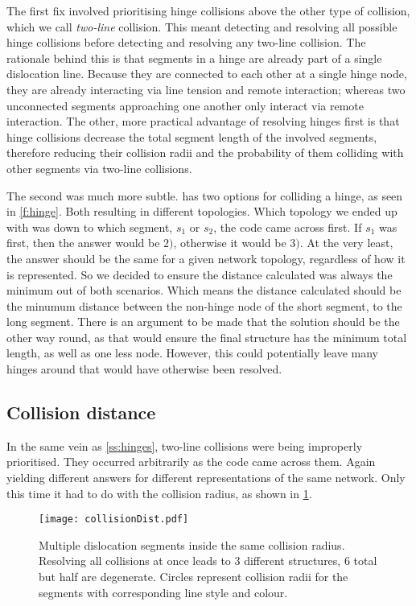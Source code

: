 The first fix involved prioritising hinge collisions above the other type of collision, which we call \emph{two-line} collision. This meant detecting and resolving all possible hinge collisions before detecting and resolving any two-line collision. The rationale behind this is that segments in a hinge are already part of a single dislocation line. Because they are connected to each other at a single hinge node, they are already interacting via line tension and remote interaction; whereas two unconnected segments approaching one another only interact via remote interaction. The other, more practical advantage of resolving hinges first is that hinge collisions decrease the total segment length of the involved segments, therefore reducing their collision radii and the probability of them colliding with other segments via two-line collisions.

The second was much more subtle.  has two options for colliding a hinge, as seen in \cref{f:hinge}. Both resulting in different topologies. Which topology we ended up with was down to which segment, $s_1$ or $s_2$, the code came across first. If $s_1$ was first, then the answer would be $2)$, otherwise it would be $3)$. At the very least, the answer should be the same for a given network topology, regardless of how it is represented. So we decided to ensure the distance calculated was always the minimum out of both scenarios. Which means the distance calculated should be the minumum distance between the non-hinge node of the short segment, to the long segment. There is an argument to be made that the solution should be the other way round, as that would ensure the final structure has the minimum total length, as well as one less node. However, this could potentially leave many hinges around that would have otherwise been resolved.

\subsection{Collision distance}\label{ss:collisionDistance}

In the same vein as \cref{ss:hinges}, two-line collisions were being improperly prioritised. They occurred arbitrarily as the code came across them. Again yielding different answers for different representations of the same network. Only this time it had to do with the collision radius, as shown in \cref{f:collisionRadius}.
\begin{figure}
    \centering
    \texttt{[image: collisionDist.pdf]}
    \caption[Dislocation segments inside different collision radii.]{Multiple dislocation segments inside the same collision radius. Resolving all collisions at once leads to 3 different structures, 6 total but half are degenerate. Circles represent collision radii for the segments with corresponding line style and colour.}
    \label{f:collisionRadius}
\end{figure}

